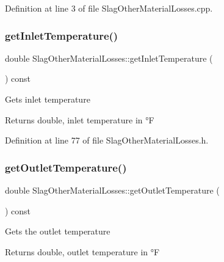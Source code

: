 Definition at line 3 of file Slag\+Other\+Material\+Losses.\+cpp.

\mbox{\label{class_slag_other_material_losses_aebd0f1b7d6c4bf0deb8ce8a86c5a80a7}} 
\subsubsection{\texorpdfstring{get\+Inlet\+Temperature()}{getInletTemperature()}}
{\footnotesize\ttfamily double Slag\+Other\+Material\+Losses\+::get\+Inlet\+Temperature (\begin{DoxyParamCaption}{ }\end{DoxyParamCaption}) const\hspace{0.3cm}{\ttfamily [inline]}}

Gets inlet temperature \begin{DoxyReturn}{Returns}
double, inlet temperature in °F 
\end{DoxyReturn}


Definition at line 77 of file Slag\+Other\+Material\+Losses.\+h.

\mbox{\label{class_slag_other_material_losses_a1c48f1a70aaf030451b7e350f3d6cd18}} 
\subsubsection{\texorpdfstring{get\+Outlet\+Temperature()}{getOutletTemperature()}}
{\footnotesize\ttfamily double Slag\+Other\+Material\+Losses\+::get\+Outlet\+Temperature (\begin{DoxyParamCaption}{ }\end{DoxyParamCaption}) const\hspace{0.3cm}{\ttfamily [inline]}}

Gets the outlet temperature \begin{DoxyReturn}{Returns}
double, outlet temperature in °F 
\end{DoxyReturn}


